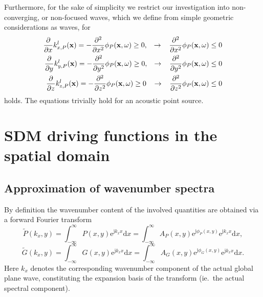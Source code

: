 \documentclass[12pt,a4paper]{article}
\newcommand{\td}{\mathrm{d}}
\newcommand{\te}{\mathrm{e}}
\newcommand{\ti}{\mathrm{j}}
\newcommand{\vx}{\mathbf{x}}
\begin{document}
Furthermore, for the sake of simplicity we restrict our investigation into non-converging, or non-focused waves, which we define from simple geometric considerations as waves, for 
\begin{eqnarray}
\frac{\partial}{\partial x} k_{x,P}^l(\vx) = -\frac{\partial^2}{\partial x^2} \phi_P (\vx,\omega) \geq 0, \hspace{3mm}\rightarrow \hspace{3mm} \frac{\partial^2}{\partial x^2} \phi_P (\vx,\omega) \leq 0\\
\frac{\partial}{\partial y} k_{y,P}^l(\vx) = -\frac{\partial^2}{\partial y^2} \phi_P (\vx,\omega) \geq 0, \hspace{3mm}\rightarrow \hspace{3mm} \frac{\partial^2}{\partial y^2} \phi_P (\vx,\omega) \leq 0\\
\frac{\partial}{\partial z} k_{z,P}^l(\vx) = -\frac{\partial^2}{\partial z^2} \phi_P (\vx,\omega) \geq 0 \hspace{3mm}\rightarrow \hspace{3mm} \frac{\partial^2}{\partial z^2} \phi_P (\vx,\omega) \leq 0
\end{eqnarray}
holds.
The equations trivially hold for an acoustic point source.

\section{SDM driving functions in the spatial domain}

\subsection{Approximation of wavenumber spectra}
By definition the wavenumber content of the involved quantities are obtained via a forward Fourier transform
\begin{equation}
\tilde{P}(k_x,y) = \int_{-\infty}^{\infty} P(x,y) \te^{\ti k_x x} \td x = \int_{-\infty}^{\infty} A_P(x,y) \te^{\ti \phi_P(x,y)} \te^{\ti k_x x} \td x,
\end{equation}
\begin{equation}
\tilde{G}(k_x,y) = \int_{-\infty}^{\infty} G(x,y) \te^{\ti k_x x} \td x = \int_{-\infty}^{\infty} A_G(x,y) \te^{\ti \phi_G(x,y)} \te^{\ti k_x x} \td x.
\end{equation}
Here $k_x$ denotes the corresponding wavenumber component of the actual global plane wave, constituting the expansion basis of the transform (ie.\ the actual spectral component).
\end{document}
